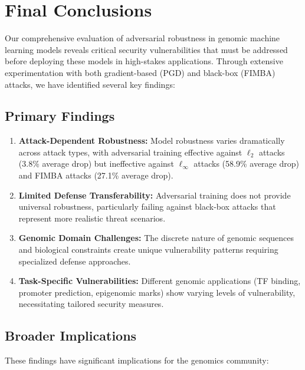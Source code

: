 \documentclass{article} %
\begin{document}
\section{Final Conclusions}

Our comprehensive evaluation of adversarial robustness in genomic machine learning models reveals critical security vulnerabilities that must be addressed before deploying these models in high-stakes applications. Through extensive experimentation with both gradient-based (PGD) and black-box (FIMBA) attacks, we have identified several key findings:

\subsection{Primary Findings}

\begin{enumerate}
    \item \textbf{Attack-Dependent Robustness:} Model robustness varies dramatically across attack types, with adversarial training effective against $\ell_2$ attacks (3.8\% average drop) but ineffective against $\ell_\infty$ attacks (58.9\% average drop) and FIMBA attacks (27.1\% average drop).
    
    \item \textbf{Limited Defense Transferability:} Adversarial training does not provide universal robustness, particularly failing against black-box attacks that represent more realistic threat scenarios.
    
    \item \textbf{Genomic Domain Challenges:} The discrete nature of genomic sequences and biological constraints create unique vulnerability patterns requiring specialized defense approaches.
    
    \item \textbf{Task-Specific Vulnerabilities:} Different genomic applications (TF binding, promoter prediction, epigenomic marks) show varying levels of vulnerability, necessitating tailored security measures.
\end{enumerate}

\subsection{Broader Implications}

These findings have significant implications for the genomics community:
\end{document}
